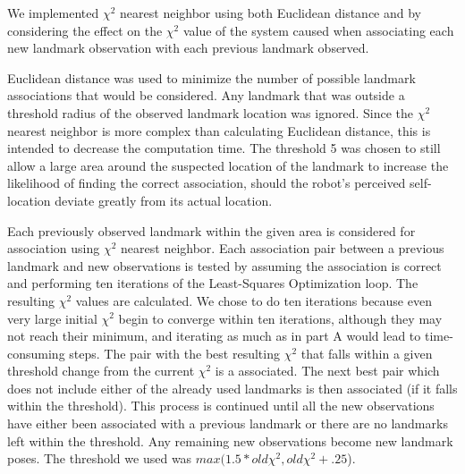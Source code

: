 \documentclass[12pt]{article}
\begin{document}
We implemented $\chi^2$ nearest neighbor using both Euclidean distance and by considering the effect on the $\chi^2$ value of the system caused when associating each new landmark observation with each previous landmark observed.

Euclidean distance was used to minimize the number of possible landmark associations that would be considered.  Any landmark that was outside a threshold radius of the observed landmark location was ignored.  Since the $\chi^2$ nearest neighbor is more complex than calculating Euclidean distance, this is intended to decrease the computation time.  The threshold 5 was chosen to still allow a large area around the suspected location of the landmark to increase the likelihood of finding the correct association, should the robot's perceived self-location deviate greatly from its actual location.

Each previously observed landmark within the given area is considered for association using $\chi^2$ nearest neighbor.  Each association pair between a previous landmark and new observations is tested by assuming the association is correct and performing ten iterations of the Least-Squares Optimization loop. The resulting $\chi^2$ values are calculated.  We chose to do ten iterations because even very large initial $\chi^2$ begin to converge within ten iterations, although they may not reach their minimum, and iterating as much as in part A would lead to time-consuming steps.  The pair with the best resulting $\chi^2$ that falls within a given threshold change from the current $\chi^2$ is a associated.  The next best pair which does not include either of the already used landmarks is then associated (if it falls within the threshold).  This process is continued until all the new observations have either been associated with a previous landmark or there are no landmarks left within the threshold.  Any remaining new observations become new landmark poses.  The threshold we used was $max(1.5*old\chi^2, old\chi^2 + .25$).

\end{document}
